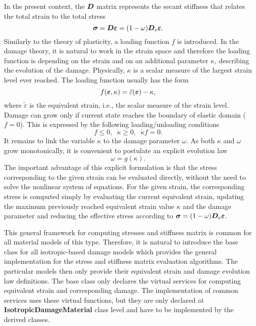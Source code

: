 \documentclass[12pt,draft]{article}
\newcommand{\class}[1]{{\bf #1}}
\newcommand{\mbf}[1]{\mbox{\boldmath$#1$}}
\begin{document}
 In the present context, the $\mbf{D}$ matrix represents the secant
 stiffness that relates the total strain to the total stress
 $$
 \mbf{\sigma}=\mbf{D}\mbf{\varepsilon} = (1-\omega)\mbf{D}_e\mbf{\varepsilon}.
 $$
 Similarly to the theory of plasticity, a loading function $f$ is
 introduced. In the damage theory, it is natural to work in the strain
 space and therefore the loading function is depending on the strain
 and on an additional parameter $\kappa$, describing the evolution of
 the damage. Physically, $\kappa$ is a scalar measure of the
 largest strain level ever reached. The loading function usually has
 the form
 $$
 f(\mbf{\varepsilon}, \kappa) = \tilde\varepsilon(\mbf{\varepsilon}) - \kappa,
 $$
 where $\tilde\varepsilon$ is the equivalent strain, i.e., the scalar
 measure of the strain level.
 Damage can grow only if current state reaches the boundary of elastic
 domain ($f=0$). This is expressed by the following loading/unloading
 conditions
 $$
 f \le 0,\;\;\dot\kappa \ge0,\;\;\dot\kappa f = 0.
 $$ 
 It remains to link the variable $\kappa$ to the damage parameter
 $\omega$. As both $\kappa$ and $\omega$ grow monotonically, it is
 convenient to postulate an explicit evolution law
 $$
 \omega = g(\kappa).
 $$
 The important advantage of this explicit formulation is that the
 stress corresponding to the given strain can be evaluated directly,
 without the need to solve the nonlinear system of equations.
 For the given strain, the corresponding stress is computed simply by
 evaluating the current equivalent strain, updating the maximum
 previously reached equivalent strain value $\kappa$  and the damage
 parameter and reducing the effective stress according to $\mbf{\sigma}
 = (1-\omega)\mbf{D}_e \mbf{\varepsilon}$.

 This general framework for computing stresses and
 stiffness matrix is  common for all material models of this type.
 Therefore, it is natural to introduce
 the base class for all isotropic-based damage models which provides the general
 implementation for the stress and stiffness matrix evaluation
 algorithms. The particular models then only provide their equivalent
 strain and damage evolution law definitions.
 The base class only declares the virtual services for computing equivalent
 strain and corresponding damage. The implementation of common services
 uses these virtual functions, but they are only declared at
 \class{IsotropicDamageMaterial} class level and have to be
 implemented by the derived classes.
\end{document}
